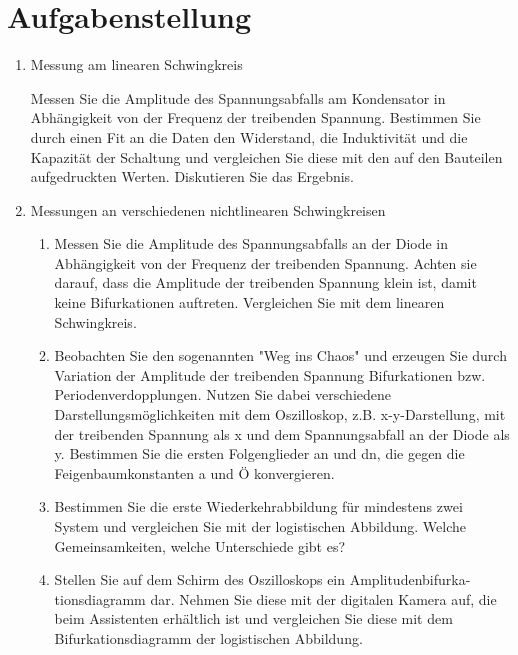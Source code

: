 \section{Aufgabenstellung}

\begin{enumerate}
\item Messung am linearen Schwingkreis

Messen Sie die Amplitude des Spannungsabfalls am Kondensator in 
Abhängigkeit von der Frequenz der treibenden Spannung. Bestimmen Sie durch 
einen Fit an die Daten den Widerstand, die Induktivität und die Kapazität der 
Schaltung und vergleichen Sie diese mit den auf den Bauteilen aufgedruckten 
Werten. Diskutieren Sie das Ergebnis. 

\item Messungen an verschiedenen nichtlinearen Schwingkreisen 

\begin{enumerate}

\item Messen Sie die Amplitude des Spannungsabfalls an der Diode in 
Abhängigkeit von der Frequenz der treibenden Spannung. Achten sie     
darauf, dass die Amplitude der treibenden Spannung klein ist, damit        
keine Bifurkationen auftreten. Vergleichen Sie mit dem linearen          
Schwingkreis. 
\item Beobachten Sie den sogenannten "Weg ins Chaos" und erzeugen Sie 
durch Variation der Amplitude der treibenden Spannung Bifurkationen 
bzw. Periodenverdopplungen. Nutzen Sie dabei verschiedene 
Darstellungsmöglichkeiten mit dem Oszilloskop, z.B. x-y-Darstellung, mit 
der treibenden Spannung als x und dem Spannungsabfall an der Diode 
als y. Bestimmen Sie die ersten Folgenglieder an und dn, die gegen die 
Feigenbaumkonstanten a und Ö konvergieren. 
\item Bestimmen Sie die erste Wiederkehrabbildung für mindestens zwei 
 System und vergleichen Sie mit der logistischen Abbildung. Welche 
Gemeinsamkeiten, welche Unterschiede gibt es? 
\item Stellen Sie auf dem Schirm des Oszilloskops ein Amplitudenbifurka- 
tionsdiagramm dar. Nehmen Sie diese mit der digitalen Kamera auf, die 
beim Assistenten erhältlich ist und vergleichen Sie diese mit dem 
Bifurkationsdiagramm der logistischen Abbildung.

\end{enumerate}
\end{enumerate}